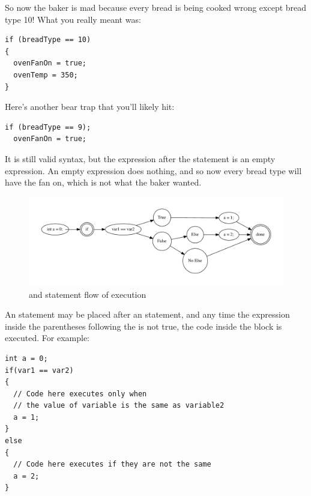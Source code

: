 So now the baker is mad because every bread is being cooked wrong except bread type 10!
What you really meant was: 

\noindent\begin{minipage}{\linewidth}\begin{lstlisting}
if (breadType == 10)
{
  ovenFanOn = true;
  ovenTemp = 350;
}
\end{lstlisting}\end{minipage}

Here's another bear trap that you'll likely hit:

\noindent\begin{minipage}{\linewidth}\begin{lstlisting}
if (breadType == 9);
  ovenFanOn = true;
\end{lstlisting}\end{minipage}

It is still valid syntax, but the expression after the  statement is an empty expression.
An empty expression does nothing, and so now every bread type will have the fan on, which is not what the baker wanted.




\begin{figure}[tbh]
  \centering
  \includegraphics[width=\textwidth]{diagrams/if-flow.pdf}
  \caption{ and  statement flow of execution} \label{fig-if-flowchart}
\end{figure}


An  statement may be placed after an  statement, and any time the expression inside the parentheses following the  is not true, the code inside the  block is executed. 
For example:

\noindent\begin{minipage}{\linewidth}\begin{lstlisting}
int a = 0;
if(var1 == var2)
{
  // Code here executes only when
  // the value of variable is the same as variable2
  a = 1;
}
else
{
  // Code here executes if they are not the same
  a = 2;
}
\end{lstlisting}\end{minipage}

